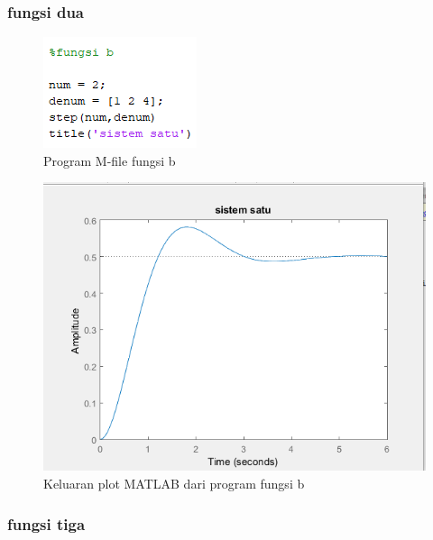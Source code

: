 \documentclass[12pt]{journal}
\begin{document}
\subsubsection{fungsi dua}

\begin{figure}[H]
    \centering
    \includegraphics{7_b.png}
    \caption{Program M-file fungsi b}
    \label{soal_b}
\end{figure}
\begin{figure}[H]
    \centering
    \includegraphics[width=\textwidth]{hasil_7_b.png}
    \caption{Keluaran plot MATLAB dari program fungsi b}
    \label{hasil_b}
\end{figure}

\subsubsection{fungsi tiga}
\end{document}
